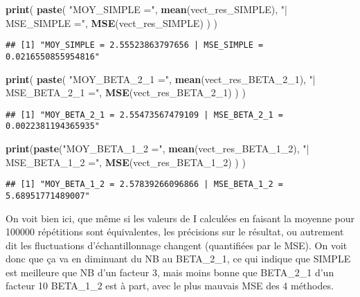 \documentclass[]{article}
\newenvironment{Shaded}{\begin{snugshade}}{\end{snugshade}}
\newcommand{\DecValTok}[1]{\textcolor[rgb]{0.00,0.00,0.81}{#1}}
\newcommand{\KeywordTok}[1]{\textcolor[rgb]{0.13,0.29,0.53}{\textbf{#1}}}
\newcommand{\NormalTok}[1]{#1}
\newcommand{\StringTok}[1]{\textcolor[rgb]{0.31,0.60,0.02}{#1}}
\begin{document}
\begin{Shaded}
\begin{Highlighting}[]
\KeywordTok{print}\NormalTok{( }\KeywordTok{paste}\NormalTok{( }\StringTok{"MOY_SIMPLE ="}\NormalTok{, }\KeywordTok{mean}\NormalTok{(vect_res_SIMPLE), }
              \StringTok{"| MSE_SIMPLE ="}\NormalTok{, }\KeywordTok{MSE}\NormalTok{(vect_res_SIMPLE) ) )}
\end{Highlighting}
\end{Shaded}

\begin{verbatim}
## [1] "MOY_SIMPLE = 2.55523863797656 | MSE_SIMPLE = 0.0216550855954816"
\end{verbatim}

\begin{Shaded}
\begin{Highlighting}[]
\KeywordTok{print}\NormalTok{( }\KeywordTok{paste}\NormalTok{( }\StringTok{"MOY_BETA_2_1 ="}\NormalTok{, }\KeywordTok{mean}\NormalTok{(vect_res_BETA_}\DecValTok{2}\NormalTok{_}\DecValTok{1}\NormalTok{), }
              \StringTok{"| MSE_BETA_2_1 ="}\NormalTok{, }\KeywordTok{MSE}\NormalTok{(vect_res_BETA_}\DecValTok{2}\NormalTok{_}\DecValTok{1}\NormalTok{) ) )}
\end{Highlighting}
\end{Shaded}

\begin{verbatim}
## [1] "MOY_BETA_2_1 = 2.55473567479109 | MSE_BETA_2_1 = 0.0022381194365935"
\end{verbatim}

\begin{Shaded}
\begin{Highlighting}[]
\KeywordTok{print}\NormalTok{(}\KeywordTok{paste}\NormalTok{(}\StringTok{"MOY_BETA_1_2 ="}\NormalTok{, }\KeywordTok{mean}\NormalTok{(vect_res_BETA_}\DecValTok{1}\NormalTok{_}\DecValTok{2}\NormalTok{), }
            \StringTok{"| MSE_BETA_1_2 ="}\NormalTok{, }\KeywordTok{MSE}\NormalTok{(vect_res_BETA_}\DecValTok{1}\NormalTok{_}\DecValTok{2}\NormalTok{)  ) )}
\end{Highlighting}
\end{Shaded}

\begin{verbatim}
## [1] "MOY_BETA_1_2 = 2.57839266096866 | MSE_BETA_1_2 = 5.68951771489007"
\end{verbatim}

On voit bien ici, que même si les valeurs de I calculées en faisant la
moyenne pour 100000 répétitions sont équivalentes, les précisions sur le
résultat, ou autrement dit les fluctuations d'échantillonnage changent
(quantifiées par le MSE). On voit donc que ça va en diminuant du NB au
BETA\_2\_1, ce qui indique que SIMPLE est meilleure que NB d'un facteur
3, mais moins bonne que BETA\_2\_1 d'un facteur 10 BETA\_1\_2 est à
part, avec le plus mauvais MSE des 4 méthodes.
\end{document}
